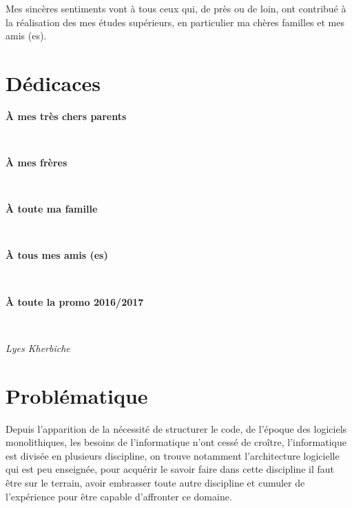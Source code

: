 \documentclass[12pt, a4paper, openany]{report}
\begin{document}
   Mes sincères sentiments vont à tous ceux qui, de près ou de loin, ont contribué à la réalisation des mes études supérieurs, en particulier ma chères familles et mes amis (es).\\
   
   
\chapter*{Dédicaces}
\begin{center}
\begin{Large} \textbf{À mes très chers parents} \end{Large}\\ 
\begin{Large} \textbf{À mes frères} \end{Large}\\
\begin{Large} \textbf{À toute ma famille} \end{Large}\\
\begin{Large} \textbf{À tous mes amis (es)} \end{Large} \\ 
\begin{Large} \textbf{À toute la promo 2016/2017} \end{Large}\\
\end{center}
\begin{flushright} \begin{Large} \textit{Lyes Kherbiche} \end{Large} \end{flushright}

\tableofcontents
\listoffigures


\chapter*{Problématique}
   Depuis l’apparition de la nécessité de structurer le code, de l'époque des logiciels monolithiques, les besoins de l'informatique n'ont cessé de croître, l'informatique est divisée en plusieurs discipline, on trouve notamment l'architecture logicielle qui est peu enseignée, pour acquérir le savoir faire dans cette discipline il faut être sur le terrain, avoir embrasser toute autre discipline et cumuler de l’expérience pour être capable d'affronter ce domaine. 
   
\end{document}
